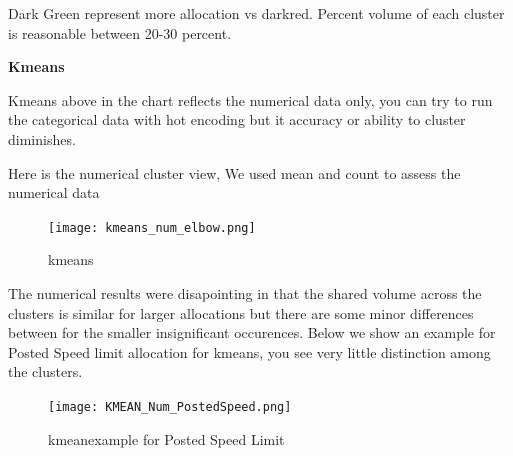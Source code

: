 \documentclass[conference]{IEEEtran}
\begin{document}
 Dark Green represent more allocation vs darkred.  Percent volume of each cluster is reasonable between 20-30 percent.

\begin{center} 
\textbf{Kmeans} 
\end{center}
Kmeans above in the chart reflects the numerical data only,  you can try to run the categorical data with hot encoding but it accuracy or ability to cluster diminishes.

Here is the numerical cluster view,  We used mean and count to assess the numerical data

\begin{figure}[!h]
	\texttt{[image: kmeans\_num\_elbow.png]}
	\caption{kmeans}
	\label{fig: Kmeans Elbow Chart}
 \end{figure}
The numerical results were disapointing in that the shared volume across the clusters is similar for larger allocations but there are some minor differences between for the smaller insignificant occurences. Below we show an example for Posted Speed limit allocation for kmeans, you see very little distinction among the clusters.

\begin{figure}[!h]
	\texttt{[image: KMEAN\_Num\_PostedSpeed.png]}
	\caption{kmeanexample for Posted Speed Limit}
	\label{fig: Example View for Kmeans Posted Speed Limit Cluster Allocation}
 \end{figure}
\end{document}
